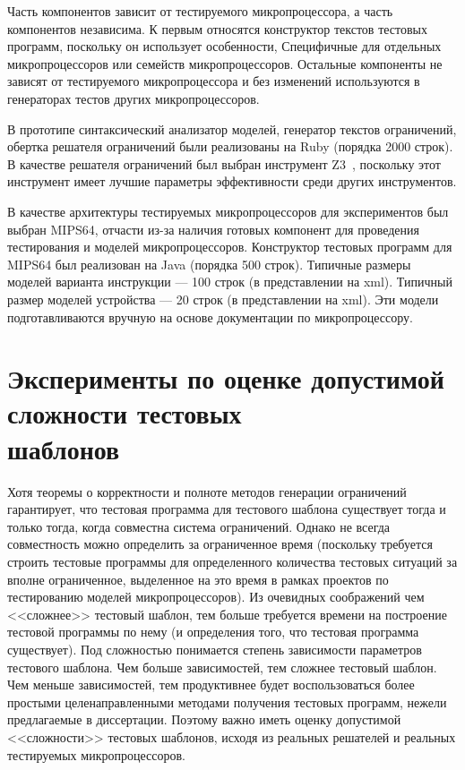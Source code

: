 Часть компонентов зависит от тестируемого микропроцессора, а часть компонентов независима. К первым относятся конструктор текстов тестовых программ, поскольку он использует особенности, Специфичные для отдельных микропроцессоров или семейств микропроцессоров. Остальные компоненты не зависят от тестируемого микропроцессора и без изменений используются в генераторах тестов других микропроцессоров.

В прототипе синтаксический анализатор моделей, генератор текстов ограничений, обертка решателя ограничений были реализованы на Ruby (порядка 2000 строк). В качестве решателя ограничений был выбран инструмент Z3~\cite{Z3}, поскольку этот инструмент имеет лучшие параметры эффективности среди других инструментов.

В качестве архитектуры тестируемых микропроцессоров для экспериментов был выбран MIPS64, отчасти из-за наличия готовых компонент для проведения тестирования и моделей микропроцессоров. Конструктор тестовых программ для MIPS64 был реализован на Java (порядка 500 строк). Типичные размеры моделей варианта инструкции --- 100 строк (в представлении на xml). Типичный размер моделей устройства --- 20 строк (в представлении на xml). Эти модели подготавливаются вручную на основе документации по микропроцессору.

\section{Эксперименты по оценке допустимой сложности тестовых\\шаблонов}\label{sec:templates_estimation}


Хотя теоремы о корректности и полноте методов генерации ограничений гарантирует, что тестовая программа для тестового шаблона существует тогда и только тогда, когда совместна система ограничений. Однако не всегда совместность можно определить за ограниченное время (поскольку требуется строить тестовые программы для определенного количества тестовых ситуаций за вполне ограниченное, выделенное на это время в рамках проектов по тестированию моделей микропроцессоров). Из очевидных соображений чем <<сложнее>> тестовый шаблон, тем больше требуется времени на построение тестовой программы по нему (и определения того, что тестовая программа существует). Под сложностью понимается степень зависимости параметров тестового шаблона. Чем больше зависимостей, тем сложнее тестовый шаблон. Чем меньше зависимостей, тем продуктивнее будет воспользоваться более простыми целенаправленными методами получения тестовых программ, нежели предлагаемые в диссертации. Поэтому важно иметь оценку допустимой <<сложности>> тестовых шаблонов, исходя из реальных решателей и реальных тестируемых микропроцессоров.

